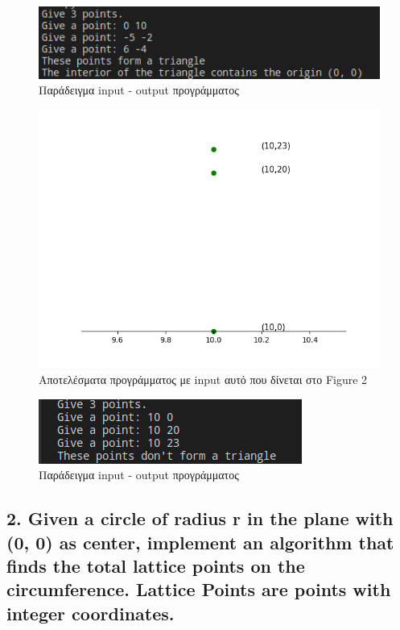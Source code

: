 \documentclass[12pt]{article}
\newenvironment{matlab}
	{\begin{figure}[H]\centering\captionsetup{justification=centering}}
	{\end{figure}}
\begin{document}
\begin{matlab}
	\includegraphics[scale=0.7]{images/exercise1_2.png}
	\caption{Παράδειγμα input - output προγράμματος}
\end{matlab}

\begin{matlab}
	\includegraphics[scale=0.8]{images/exercise1_3.png}
	\caption{Αποτελέσματα προγράμματος με input αυτό που δίνεται στο Figure 2}
\end{matlab}

\begin{matlab}
	\includegraphics[scale=0.7]{images/exercise1_4.png}
	\caption{Παράδειγμα input - output προγράμματος}
\end{matlab}

\pagebreak

\subsection*{2. Given a circle of radius r in the plane with (0, 0) as center, implement an
algorithm that finds the total lattice points on the circumference. Lattice Points are points
with integer coordinates.}
\end{document}
